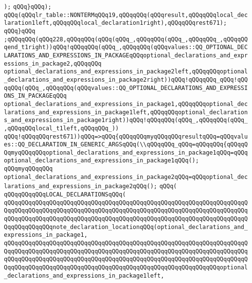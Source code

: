 \verb|);|\newline
\verb|qQQq}qQQq);|\newline
\verb|qQQq(qQQqlr_table::NONTERMqQQq19,qQQqqQQq(qQQqresult,qQQqqQQqlocal_declaration1left,qQQqqQQqlocal_declaration1right),qQQqqQQqrest671);|\newline
\verb|qQQq}qQQq|\newline
\verb|;qQQqqQQq(qQQq228,qQQqqQQq(qQQq(qQQq_,qQQqqQQq(qQQq_,qQQqqQQq_,qQQqqQQqend_t1right))qQQq!qQQqqQQq(qQQq_,qQQqqQQq(qQQqvalues::QQ_OPTIONAL_DECLARATIONS_AND_EXPRESSIONS_IN_PACKAGEqQQqoptional_declarations_and_expressions_in_package2,qQQqqQQq|\newline
\verb|optional_declarations_and_expressions_in_package2left,qQQqqQQqoptional_declarations_and_expressions_in_package2right))qQQq!qQQqqQQq_qQQq!qQQqqQQq(qQQq_,qQQqqQQq(qQQqvalues::QQ_OPTIONAL_DECLARATIONS_AND_EXPRESSIONS_IN_PACKAGEqQQq|\newline
\verb|optional_declarations_and_expressions_in_package1,qQQqqQQqoptional_declarations_and_expressions_in_package1left,qQQqqQQqoptional_declarations_and_expressions_in_package1right))qQQq!qQQqqQQq(qQQq_,qQQqqQQq(qQQq_,qQQqqQQqlocal_t1left,qQQqqQQq_))|\newline
\verb|qQQq!qQQqqQQqrest671))qQQq=>qQQq{qQQqqQQqmyqQQqqQQqresultqQQq=qQQqvalues::QQ_DECLARATION_IN_GENERIC_ARGSqQQq(\\qQQqqQQq_qQQq=qQQqqQQq{qQQqqQQqmyqQQqqQQqoptional_declarations_and_expressions_in_package1qQQq=qQQqoptional_declarations_and_expressions_in_package1qQQq();|\newline
\verb|qQQqmyqQQqqQQq|\newline
\verb|optional_declarations_and_expressions_in_package2qQQq=qQQqoptional_declarations_and_expressions_in_package2qQQq();|\newline
\verb|qQQq(|\newline
\verb|qQQqqQQqqQQqLOCAL_DECLARATIONSqQQq(|\newline
\verb|qQQqqQQqqQQqqQQqqQQqqQQqqQQqqQQqqQQqqQQqqQQqqQQqqQQqqQQqqQQqqQQqqQQqqQQqqQQqqQQqqQQqqQQqqQQqqQQqqQQqqQQqqQQqqQQqqQQqqQQqqQQqqQQqqQQqqQQqqQQqqQQqqQQqqQQqqQQqqQQqqQQqqQQqqQQqqQQqqQQqqQQqqQQqqQQqqQQqqQQqqQQqqQQqqQQqqQQqqQQqqQQqnote_declaration_locationqQQq(optional_declarations_and_expressions_in_package1,|\newline
\verb|qQQqqQQqqQQqqQQqqQQqqQQqqQQqqQQqqQQqqQQqqQQqqQQqqQQqqQQqqQQqqQQqqQQqqQQqqQQqqQQqqQQqqQQqqQQqqQQqqQQqqQQqqQQqqQQqqQQqqQQqqQQqqQQqqQQqqQQqqQQqqQQqqQQqqQQqqQQqqQQqqQQqqQQqqQQqqQQqqQQqqQQqqQQqqQQqqQQqqQQqqQQqqQQqqQQqqQQqqQQqqQQqqQQqqQQqqQQqqQQqqQQqqQQqqQQqqQQqqQQqqQQqqQQqqQQqoptional_declarations_and_expressions_in_package1left,|\newline

